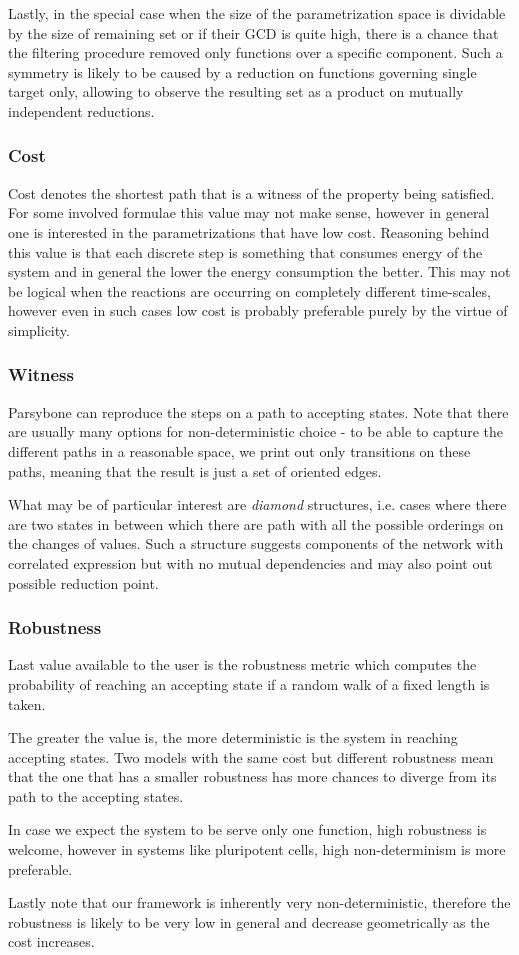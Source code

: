 \documentclass[12pt]{article}
\begin{document}
Lastly, in the special case when the size of the parametrization space is dividable by the size of remaining set or if their GCD is quite high, there is a chance that the filtering procedure removed only functions over a specific component. Such a symmetry is likely to be caused by a reduction on functions governing single target only, allowing to observe the resulting set as a product on mutually independent reductions.

\subsubsection*{Cost}
Cost denotes the shortest path that is a witness of the property being satisfied. 
For some involved formulae this value may not make sense, however in general one is interested in the parametrizations that have low cost.
Reasoning behind this value is that each discrete step is something that consumes energy of the system and in general the lower the energy consumption the better. 
This may not be logical when the reactions are occurring on completely different time-scales, however even in such cases low cost is probably preferable purely by the virtue of simplicity.

\subsubsection*{Witness}
Parsybone can reproduce the steps on a path to accepting states. 
Note that there are usually many options for non-deterministic choice - to be able to capture the different paths in a reasonable space, we print out only transitions on these paths, meaning that the result is just a set of oriented edges.

What may be of particular interest are \emph{diamond} structures, i.e. cases where there are two states in between which there are path with all the possible orderings on the changes of values.
Such a structure suggests components of the network with correlated expression but with no mutual dependencies and may also point out possible reduction point.

\subsubsection*{Robustness}
Last value available to the user is the robustness metric which computes the probability of reaching an accepting state if a random walk of a fixed length is taken. 

The greater the value is, the more deterministic is the system in reaching accepting states. Two models with the same cost but different robustness mean that the one that has a smaller robustness has more chances to diverge from its path to the accepting states. 

In case we expect the system to be serve only one function, high robustness is welcome, however in systems like pluripotent cells, high non-determinism is more preferable.

Lastly note that our framework is inherently very non-deterministic, therefore the robustness is likely to be very low in general and decrease geometrically as the cost increases.



\end{document}
